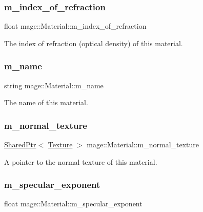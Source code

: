 \subsubsection{\texorpdfstring{m\+\_\+index\+\_\+of\+\_\+refraction}{m\_index\_of\_refraction}}
{\footnotesize\ttfamily float mage\+::\+Material\+::m\+\_\+index\+\_\+of\+\_\+refraction\hspace{0.3cm}{\ttfamily [private]}}

The index of refraction (optical density) of this material. \hypertarget{structmage_1_1_material_a2b3e839a8ae093d53b12529d61ec6605}{}\label{structmage_1_1_material_a2b3e839a8ae093d53b12529d61ec6605} 
\subsubsection{\texorpdfstring{m\+\_\+name}{m\_name}}
{\footnotesize\ttfamily string mage\+::\+Material\+::m\+\_\+name\hspace{0.3cm}{\ttfamily [private]}}

The name of this material. \hypertarget{structmage_1_1_material_a18e56785d5ca3ae5a9b99c64e70622d6}{}\label{structmage_1_1_material_a18e56785d5ca3ae5a9b99c64e70622d6} 
\subsubsection{\texorpdfstring{m\+\_\+normal\+\_\+texture}{m\_normal\_texture}}
{\footnotesize\ttfamily \hyperlink{namespacemage_a1e01ae66713838a7a67d30e44c67703e}{Shared\+Ptr}$<$ \hyperlink{classmage_1_1_texture}{Texture} $>$ mage\+::\+Material\+::m\+\_\+normal\+\_\+texture\hspace{0.3cm}{\ttfamily [private]}}

A pointer to the normal texture of this material. \hypertarget{structmage_1_1_material_a62a9e8d9f90bf569b9f692c28da6a7dc}{}\label{structmage_1_1_material_a62a9e8d9f90bf569b9f692c28da6a7dc} 
\subsubsection{\texorpdfstring{m\+\_\+specular\+\_\+exponent}{m\_specular\_exponent}}
{\footnotesize\ttfamily float mage\+::\+Material\+::m\+\_\+specular\+\_\+exponent\hspace{0.3cm}{\ttfamily [private]}}

